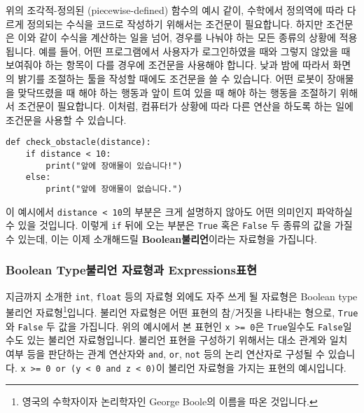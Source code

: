 \documentclass[../main.tex]{subfiles}
\begin{document}
위의 조각적-정의된 (piecewise-defined) 함수의 예시 같이, 수학에서 정의역에 따라
다르게 정의되는 수식을 코드로 작성하기 위해서는 조건문이 필요합니다.
하지만 조건문은 이와 같이 수식을 계산하는 일을 넘어, 경우를 나눠야 하는 모든
종류의 상황에 적용됩니다.
예를 들어, 어떤 프로그램에서 사용자가 로그인하였을 때와 그렇지 않았을 때
보여줘야 하는 항목이 다를 경우에 조건문을 사용해야 합니다.
낮과 밤에 따라서 화면의 밝기를 조절하는 툴을 작성할 때에도 조건문을 쓸 수
있습니다.
어떤 로봇이 장애물을 맞닥뜨렸을 때 해야 하는 행동과 앞이 트여 있을 때 해야 하는
행동을 조절하기 위해서 조건문이 필요합니다.
이처럼, 컴퓨터가 상황에 따라 다른 연산을 하도록 하는 일에 조건문을 사용할 수
있습니다.
\begin{verbatim}
def check_obstacle(distance):
    if distance < 10:
        print("앞에 장애물이 있습니다!")
    else:
        print("앞에 장애물이 없습니다.")
\end{verbatim}

이 예시에서 \verb|distance < 10|의 부분은 크게 설명하지 않아도 어떤 의미인지
파악하실 수 있을 것입니다.
이렇게 \verb|if| 뒤에 오는 부분은 \verb|True| 혹은 \verb|False| 두 종류의 값을
가질 수 있는데, 이는 이제 소개해드릴 \textbf{Boolean불리언}이라는 자료형을
가집니다.

\subsubsection{Boolean Type불리언 자료형과 Expressions표현}
지금까지 소개한 \texttt{int}, \texttt{float} 등의 자료형 외에도 자주 쓰게 될
자료형은 Boolean type불리언 자료형\footnote{영국의 수학자이자 논리학자인 George
Boole의 이름을 따온 것입니다.}입니다.  불리언 자료형은 어떤 표현의 참/거짓을
나타내는 형으로, \texttt{True}와 \texttt{False} 두 값을 가집니다.  위의
예시에서 본 표현인 \texttt{x >= 0}은 \texttt{True}일수도 \texttt{False}일수도
있는 불리언 자료형입니다.  불리언 표현을 구성하기 위해서는 대소 관계와 일치
여부 등을 판단하는 관계 연산자와 \texttt{and}, \texttt{or}, \texttt{not} 등의
논리 연산자로 구성될 수 있습니다.  \texttt{x >= 0 or (y < 0 and z < 0)}이
불리언 자료형을 가지는 표현의 예시입니다.
\end{document}
